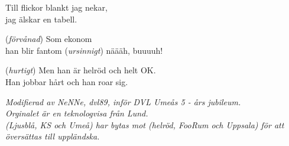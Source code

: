Till flickor blankt jag nekar,\\
jag älskar en tabell.\par
\vspace{10pt}
(\textit{förvånad}) Som ekonom\\
han blir fantom (\textit{ursinnigt}) näääh, buuuuh!\par
\vspace{10pt}
(\textit{hurtigt}) \revrpt Men han är helröd och helt OK.\\
Han jobbar hårt och han roar sig.\rpt\par
\vspace{10pt}
{\footnotesize\textit{Modifierad av NeNNe, dvl89, inför
    DVL Umeås 5 - års jubileum.\\ Orginalet är en
    teknologvisa från Lund.\\ (Ljusblå, KS och Umeå) har bytas mot
    (helröd, FooRum och Uppsala) för att översättas till uppländska.}}
